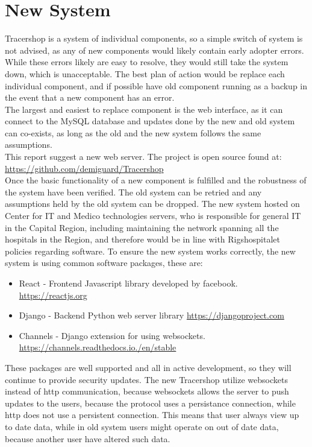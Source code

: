 \documentclass{article}
\begin{document}
\section*{New System}
Tracershop is a system of individual components, so a simple switch of system is not advised, as any of new components would likely contain early adopter errors.
While these errors likely are easy to resolve, they would still take the system down, which is unacceptable.
The best plan of action would be replace each individual component,
and if possible have old component running as a backup in the event that a new component has an error.\\
The largest and easiest to replace component is the web interface, as it can connect to the MySQL database and updates done by the new and old system can co-exists,
as long as the old and the new system follows the same assumptions.\\
This report suggest a new web server. The project is open source found at:\\
\url{https://github.com/demiguard/Tracershop}\\
Once the basic functionality of a new component is fulfilled and the robustness of the system have been verified. The old system can be retried and
any assumptions held by the old system can be dropped.
The new system hosted on Center for IT and Medico technologies servers, who is responsible for general IT in the Capital Region,
including maintaining the network spanning all the hospitals in the Region, and therefore would be in line with Rigshospitalet policies regarding software.
To ensure the new system works correctly, the new system is using common software packages, these are:
\begin{itemize}
  \item React - Frontend Javascript library developed by facebook. \url{https://reactjs.org}
  \item Django - Backend Python web server library \url{https://djangoproject.com}
  \item Channels - Django extension for using websockets. \url{https://channels.readthedocs.io./en/stable}
\end{itemize}
These packages are well supported and all in active development, so they will continue to provide security updates.
The new Tracershop utilize websockets instead of http communication, because websockets allows the server to push updates to the users,
because the protocol uses a persistance connection, while http does not use a persistent connection.
This means that user always view up to date data, while in old system users might operate on out of date data, because another user have altered such data.
\end{document}
